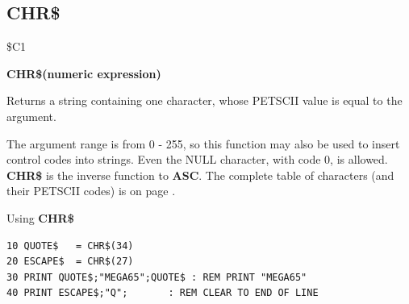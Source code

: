 
\newpage
\subsection{CHR\$}
\label{chrcommand}
\begin{description}[leftmargin=2cm,style=nextline]
\item [Token:] \$C1
\item [Format:] {\bf CHR\$(numeric expression)}
\item [Usage:] Returns a string containing one character, whose PETSCII
               value is equal to the argument.

\item [Remarks:] The argument range is from 0 - 255, so this function may
                 also be used to insert control codes into strings.
                 Even the NULL character, with code 0, is allowed. \\
                 {\bf CHR\$} is the inverse function to {\bf ASC}.
                 The complete table of characters (and their PETSCII codes) is
                 on page \pageref{appendix:asciicodes}.
\item [Example:] Using {\bf CHR\$}
\begin{tcolorbox}[colback=black,coltext=white]
\verbatimfont{\codefont}
\begin{verbatim}
10 QUOTE$   = CHR$(34)
20 ESCAPE$  = CHR$(27)
30 PRINT QUOTE$;"MEGA65";QUOTE$ : REM PRINT "MEGA65"
40 PRINT ESCAPE$;"Q";       : REM CLEAR TO END OF LINE
\end{verbatim}
\end{tcolorbox}
\end{description}


\newpage
